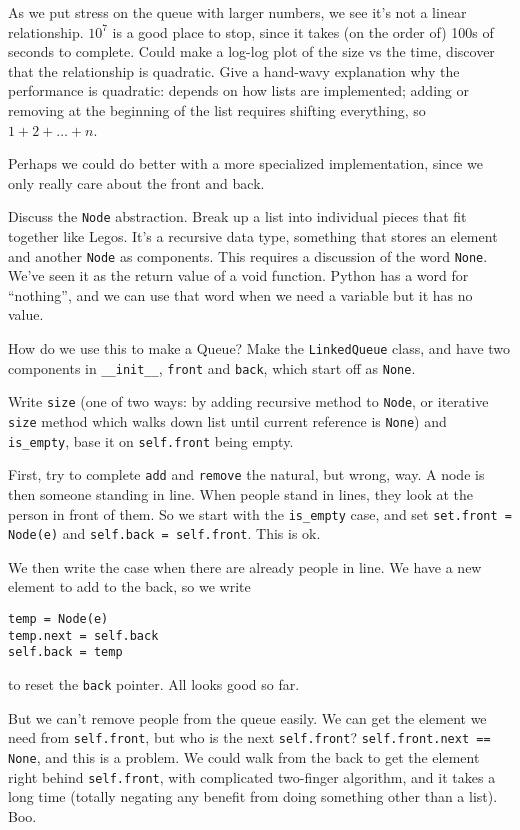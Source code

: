 \documentclass{article}
\begin{document}
As we put stress on the queue with larger numbers, we see it's not a
linear relationship. $10^7$ is a good place to stop, since it takes
(on the order of) 100s of seconds to complete.  Could make a log-log
plot of the size vs the time, discover that the relationship is
quadratic.  Give a hand-wavy explanation why the performance is
quadratic: depends on how lists are implemented; adding or removing at
the beginning of the list requires shifting everything, so
$1 + 2 + \dots + n$.

Perhaps we could do better with a more specialized implementation,
since we only really care about the front and back.

Discuss the \verb|Node| abstraction. Break up a list into individual
pieces that fit together like Legos. It's a recursive data type,
something that stores an element and another \verb|Node| as
components.  This requires a discussion of the word \verb|None|. We've
seen it as the return value of a void function. Python has a word for
``nothing'', and we can use that word when we need a variable but it has
no value.

How do we use this to make a Queue? Make the \verb|LinkedQueue| class,
and have two components in \verb|__init__|, \verb|front| and
\verb|back|, which start off as \verb|None|.

Write \verb|size| (one of two ways: by adding recursive method to
\verb|Node|, or iterative \verb|size| method which walks down list
until current reference is \verb|None|) and \verb|is_empty|, base it
on \verb|self.front| being empty.

First, try to complete \verb|add| and \verb|remove| the natural, but
wrong, way. A node is then someone standing in line. When people stand
in lines, they look at the person in front of them. So we start with
the \verb|is_empty| case, and set \verb|set.front = Node(e)| and
\verb|self.back = self.front|. This is ok.

We then write the case when there are already people in line. We have a new
element to add to the back, so we write

\begin{verbatim}
temp = Node(e)
temp.next = self.back
self.back = temp
\end{verbatim}
to reset the \verb|back| pointer. All looks good so far.

But we can't remove people from the queue easily. We can get the
element we need from \verb|self.front|, but who is the next
\verb|self.front|? \verb|self.front.next == None|, and this is a problem. We
could walk from the back to get the element right behind \verb|self.front|,
with complicated two-finger algorithm, and it takes a long time
(totally negating any benefit from doing something other than a
list). Boo.
\end{document}
